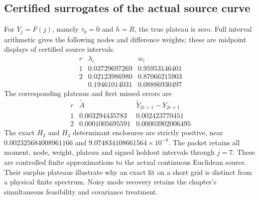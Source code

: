\subsection{Certified surrogates of the actual source curve}
For $Y_j=F(j)$, namely $\tau_0=0$ and $h=R$, the true plateau is zero.
Full interval arithmetic gives the following nodes and difference weights;
these are midpoint displays of certified source intervals.
\[
 \begin{array}{c|cc}
 r&\lambda_i&w_i\\\hline
 1&0.03729697269&0.95953146401\\
 2&0.02123986980&0.87066215903\\
  &0.19461014031&0.08886930497
 \end{array}
\]
The corresponding plateaus and first missed errors are
\[
 \begin{array}{c|cc}
 r&\widetilde A&\widetilde Y_{2r+1}-Y_{2r+1}\\\hline
 1&0.003294435783&0.002423770451\\
 2&0.0001005695591&0.00003902006495
 \end{array}
\]
The exact $H_2$ and $H_3$ determinant enclosures are strictly positive,
near $0.002325684008961166$ and $9.074834108661564\times10^{-8}$.
The packet retains all moment, node, weight, plateau and signed holdout
intervals through $j=7$. These are controlled finite approximations to the
actual continuous Euclidean source. Their surplus plateaus illustrate why
an exact fit on a short grid is distinct from a physical finite spectrum.
Noisy mode recovery retains the chapter's simultaneous feasibility and
covariance treatment.
